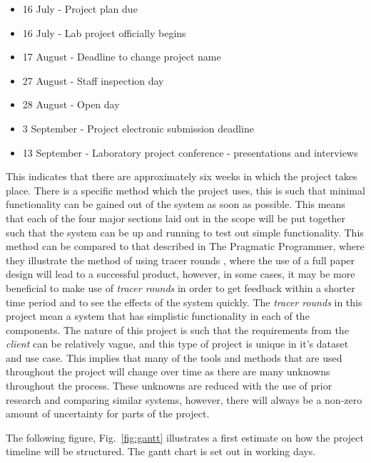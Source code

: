 \documentclass[12pt,onecolumn]{IEEEtran}
\begin{document}
\begin{itemize}
    \item 16 July - Project plan due
    \item 16 July - Lab project officially begins
    \item 17 August - Deadline to change project name
    \item 27 August - Staff inspection day
    \item 28 August - Open day
    \item 3 September - Project electronic submission deadline
    \item 13 September - Laboratory project conference - presentations and interviews
\end{itemize}

This indicates that there are approximately six weeks in which the project takes place. 
There is a specific method which the project uses, this is such that minimal functionality can be gained out of the system as soon as possible.
This means that each of the four major sections laid out in the scope will be put together such that the system can be up and running to test out simple functionality. 
This method can be compared to that described in The Pragmatic Programmer, where they illustrate the method of using tracer rounds \cite{pragmatic}, where the use of a full paper design will lead to a successful product, however, in some cases, it may be more beneficial to make use of \textit{tracer rounds} in order to get feedback within a shorter time period and to see the effects of the system quickly. The \textit{tracer rounds} in this project mean a system that has simplistic functionality in each of the components.
The nature of this project is such that the requirements from the \textit{client} can be relatively vague, and this type of project is unique in it's dataset and use case. 
This implies that many of the tools and methods that are used throughout the project will change over time as there are many unknowns throughout the process. 
These unknowns are reduced with the use of prior research and comparing similar systems, however, there will always be a non-zero amount of uncertainty for parts of the project.


The following figure, Fig.~\ref{fig:gantt} illustrates a first estimate on how the project timeline will be structured. The gantt chart is set out in working days.
\end{document}
